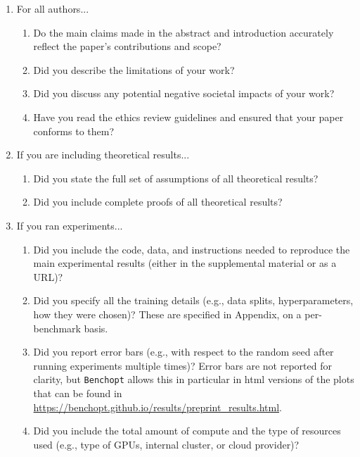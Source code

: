 \documentclass{article}
\newcommand{\Benchopt}{{{\texttt{Benchopt}}}}
\begin{document}
\begin{enumerate}

\item For all authors...
\begin{enumerate}
  \item Do the main claims made in the abstract and introduction accurately reflect the paper's contributions and scope?
    \answerYes{}
  \item Did you describe the limitations of your work?
    \answerYes{}
  \item Did you discuss any potential negative societal impacts of your work?
    \answerYes{}
  \item Have you read the ethics review guidelines and ensured that your paper conforms to them?
    \answerYes{}
\end{enumerate}

\item If you are including theoretical results...
\begin{enumerate}
  \item Did you state the full set of assumptions of all theoretical results?
    \answerNA{}
	\item Did you include complete proofs of all theoretical results?
    \answerNA{}
\end{enumerate}

\item If you ran experiments...
\begin{enumerate}
  \item Did you include the code, data, and instructions needed to reproduce the main experimental results (either in the supplemental material or as a URL)?
    \answerYes{}
  \item Did you specify all the training details (e.g., data splits, hyperparameters, how they were chosen)?
    \answerYes{} These are specified in Appendix, on a per-benchmark basis.
	\item Did you report error bars (e.g., with respect to the random seed after running experiments multiple times)?
    \answerNo{} Error bars are not reported for clarity, but \Benchopt{} allows this in particular in html versions of the plots that can be found in \url{https://benchopt.github.io/results/preprint_results.html}.
	\item Did you include the total amount of compute and the type of resources used (e.g., type of GPUs, internal cluster, or cloud provider)?
    \answerYes{}
\end{enumerate}


\end{enumerate}
\end{document}
